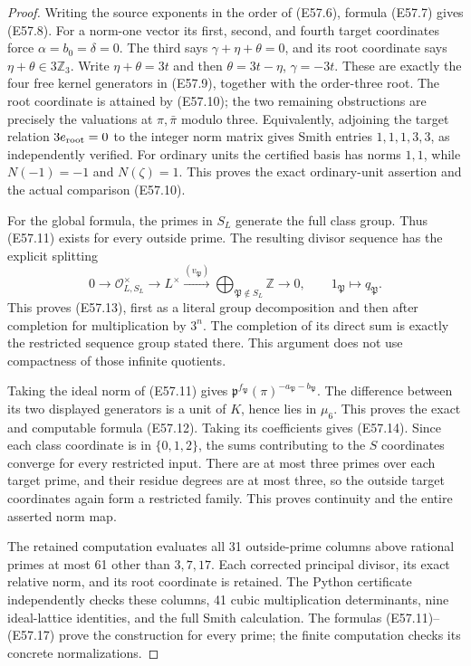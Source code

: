 \begin{proof}
Writing the source exponents in the order
of (E57.6), formula (E57.7) gives (E57.8).
For a norm-one vector its first, second,
and fourth target coordinates force
$\alpha=b_0=\delta=0$. The third says
$\gamma+\eta+\theta=0$, and its root
coordinate says $\eta+\theta\in3\mathbb Z_3$.
Write $\eta+\theta=3t$ and then
$\theta=3t-\eta$, $\gamma=-3t$.
These are exactly the four free
kernel generators in (E57.9), together
with the order-three root.
The root coordinate is attained by
(E57.10); the two remaining obstructions
are precisely the valuations at
$\pi,\bar\pi$ modulo three. Equivalently,
adjoining the target relation
$3e_{\rm root}=0$ to the integer norm
matrix gives Smith entries
$1,1,1,3,3$, as independently verified.
For ordinary units the certified basis
has norms $1,1$, while $N(-1)=-1$
and $N(\zeta)=1$. This proves the
exact ordinary-unit assertion and
the actual comparison (E57.10).

For the global formula, the primes in
$S_L$ generate the full class group.
Thus (E57.11) exists for every outside
prime. The resulting divisor sequence
has the explicit splitting
\[
 0\longrightarrow\mathcal O_{L,S_L}^{\times}
   \longrightarrow L^\times
   \xrightarrow{(v_{\mathfrak P})}
      \bigoplus_{\mathfrak P\notin S_L}\mathbb Z
   \longrightarrow0,\qquad
                1_{\mathfrak P}\longmapsto q_{\mathfrak P}.
 \tag{E57.17}
\]
This proves (E57.13), first as a
literal group decomposition and then
after completion for multiplication
by $3^n$. The completion of its direct
sum is exactly the restricted sequence
group stated there. This argument does
not use compactness of those infinite
quotients.

Taking the ideal norm of (E57.11)
gives
$\mathfrak p^{f_{\mathfrak P}}
(\pi)^{-a_{\mathfrak P}-b_{\mathfrak P}}$.
The difference between its two
displayed generators is a unit of
$K$, hence lies in $\mu_6$. This
proves the exact and computable
formula (E57.12). Taking its
coefficients gives (E57.14).
Since each class coordinate is in
$\{0,1,2\}$, the sums contributing
to the $S$ coordinates converge
for every restricted input.
There are at most three primes
over each target prime, and their
residue degrees are at most three,
so the outside target coordinates
again form a restricted family.
This proves continuity and the
entire asserted norm map.

The retained computation evaluates
all 31 outside-prime columns above
rational primes at most 61 other
than $3,7,17$. Each corrected
principal divisor, its exact
relative norm, and its root
coordinate is retained. The
Python certificate independently
checks these columns, 41 cubic
multiplication determinants,
nine ideal-lattice identities,
and the full Smith calculation.
The formulas (E57.11)--(E57.17)
prove the construction for every
prime; the finite computation
checks its concrete normalizations.
\end{proof}
